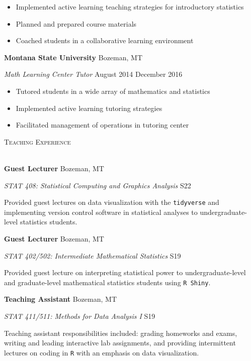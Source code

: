 \documentclass[a4paper]{article}
\newcommand{\lineunder} {
	\vspace*{-8pt} \\
	\hspace*{-18pt} \hrulefill \\
}
\newcommand{\header} [1] {
	{\hspace*{-18pt}\vspace*{6pt} \textsc{#1}}
	\vspace*{-6pt} \lineunder
}
\begin{document}
\vspace{-1mm}
\begin{itemize} \itemsep 1pt
   \item Implemented active learning teaching strategies for introductory statistics
   \item Planned and prepared course materials 
   \item Coached students in a collaborative learning environment
\end{itemize}

\textbf{Montana State University} \hfill Bozeman, MT

\textit{Math Learning Center Tutor} \hfill August 2014 \textbar{}
December 2016

\vspace{-1mm}
\begin{itemize} \itemsep 1pt
    \item Tutored students in a wide array of mathematics and statistics
    \item Implemented active learning tutoring strategies
    \item Facilitated management of operations in tutoring center
\end{itemize}

\header{Teaching Experience}
\vspace*{2mm}

\textbf{Guest Lecturer} \hfill Bozeman, MT

\emph{STAT 408: Statistical Computing and Graphics Analysis} \hfill S22

Provided guest lectures on data visualization with the
\texttt{tidyverse} and implementing version control software in
statistical analyses to undergraduate-level statistics students.
\vspace*{2mm}

\textbf{Guest Lecturer} \hfill Bozeman, MT

\emph{STAT 402/502: Intermediate Mathematical Statistics} \hfill S19

Provided guest lecture on interpreting statistical power to
undergraduate-level and graduate-level mathematical statistics students
using \texttt{R\ Shiny}. \vspace*{2mm}

\textbf{Teaching Assistant} \hfill Bozeman, MT

\emph{STAT 411/511: Methods for Data Analysis I} \hfill S19

Teaching assistant responsibilities included: grading homeworks and
exams, writing and leading interactive lab assignments, and providing
intermittent lectures on coding in \texttt{R} with an emphasis on data
visualization. \vspace*{2mm}
\end{document}
